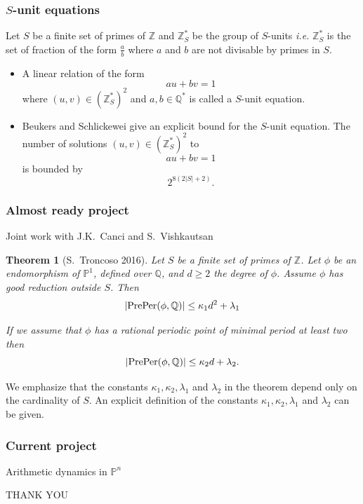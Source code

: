 \documentclass{beamer}
\def\PP{{\mathbb P}}
\def\QQ{{\mathbb Q}}
\def\ZZ{{\mathbb Z}}
\theoremstyle{thmstyle}
\theoremstyle{thmstyle}
\newtheorem*{mythm}{Theorem}
\theoremstyle{mystyle}
\theoremstyle{qstnstyle}
\begin{document}
\begin{frame}
\frametitle{$S$-unit equations}
Let $S$ be a finite set of primes of $\ZZ$ and $\ZZ_S^{*}$ be the group of $S$-units \emph{i.e.} $\ZZ_S^{*}$ is the set of fraction of the form $\displaystyle\frac{a}{b}$ where $a$ and $b$ are not divisable by primes in $S$.\pause

\begin{itemize}

\item A linear relation of the form $$au+bv=1$$  where  $(u,v) \in \left(\ZZ_S^*\right)^2$ and $a,b\in \QQ^{*}$ is called a $S$-unit equation. \pause
\item Beukers and Schlickewei give an explicit bound  for the $S$-unit equation. The number of solutions $(u,v) \in \left(\ZZ_S^{*}\right)^2$ to 
$$au+bv=1$$ 
is bounded by $$2^{8(2|S|+2)}.$$
\end{itemize}
\end{frame}



\begin{frame}
\frametitle{Almost ready project}
Joint work with J.K.\ Canci and S.\ Vishkautsan \\
\pause
\begin{mythm}[S.\ Troncoso 2016]
Let $S$  be a finite set of primes of $\ZZ$. Let $\phi$ be an endomorphism of $\PP^1$, defined over $\QQ$, and $d\geq 2$ the degree of $\phi$. Assume $\phi$ has good reduction outside $S$. Then 
$$|{\rm PrePer}(\phi,\QQ)| \leq \kappa_1 d^2+\lambda_1$$

If we assume that $\phi$ has a rational periodic point of minimal period at least two then
$$|{\rm PrePer}(\phi,\QQ)| \leq \kappa_2 d+\lambda_2.$$
\end{mythm}
\pause 

We emphasize that the constants $\kappa_1,\kappa_2,\lambda_1$ and $\lambda_2$ in the theorem depend only on the cardinality of $S$. An explicit definition of the constants $\kappa_1,\kappa_2,\lambda_1$ and $\lambda_2$ can be given.
\end{frame}


\begin{frame}
\frametitle{Current project}

\Huge{Arithmetic dynamics in $\PP^n$}
\end{frame}

\begin{frame}
\Huge{THANK YOU}
\end{frame}
\end{document}
